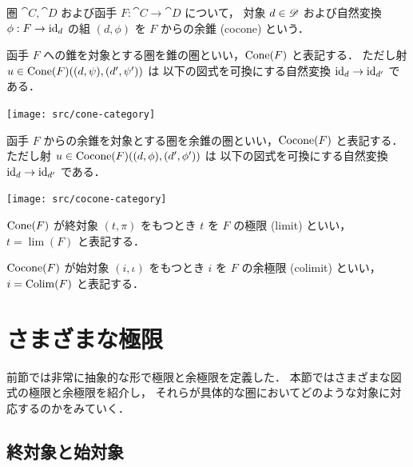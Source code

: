 \documentclass[titlepage]{ltjsreport}
\newtheorem[S]{theorem}{定理}[chapter]
\newtheorem[S]{definition}[theorem]{定義}
\newtheorem[S]{example}[theorem]{例}
\begin{document}
\begin{definition}[余錐]
  圏 $\cat{C},\cat{D}$ および函手 $F:\cat{C}\to\cat{D}$ について，
  対象 $d\in\mathscr{D}$ および自然変換 $\phi:F\to\mathrm{id}_{d}$ の組 $(d,\phi)$
  を $F$ からの余錐 (cocone) という．
\end{definition}

\begin{definition}[錐の圏]
  函手 $F$ への錐を対象とする圏を錐の圏といい，$\operatorname{Cone}(F)$ と表記する．
  ただし射 $u\in\operatorname{Cone}(F)((d,\psi),(d',\psi'))$ は
  以下の図式を可換にする自然変換 $\mathrm{id}_{d}\to\mathrm{id}_{d'}$ である．
  \begin{center}
    \texttt{[image: src/cone-category]}
  \end{center}
\end{definition}

\begin{definition}[余錐の圏]
  函手 $F$ からの余錐を対象とする圏を余錐の圏といい，$\operatorname{Cocone}(F)$ と表記する．
  ただし射 $u\in\operatorname{Cocone}(F)((d,\phi),(d',\phi'))$ は
  以下の図式を可換にする自然変換 $\mathrm{id}_{d}\to\mathrm{id}_{d'}$ である．
  \begin{center}
    \texttt{[image: src/cocone-category]}
  \end{center}
\end{definition}

\begin{definition}[極限]
  $\operatorname{Cone}(F)$ が終対象 $(t,\pi)$ をもつとき $t$ を $F$ の極限 (limit) といい，
  $t=\lim(F)$ と表記する．
\end{definition}

\begin{definition}[余極限]
  $\operatorname{Cocone}(F)$ が始対象 $(i,\iota)$ をもつとき $i$ を $F$ の余極限 (colimit) といい，
  $i=\operatorname{Colim}(F)$ と表記する．
\end{definition}

\section{さまざまな極限}

前節では非常に抽象的な形で極限と余極限を定義した．
本節ではさまざまな図式の極限と余極限を紹介し，
それらが具体的な圏においてどのような対象に対応するのかをみていく．

\subsection{終対象と始対象}
\end{document}
